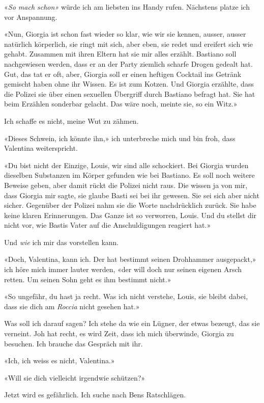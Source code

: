 «\emph{So mach schon»} würde ich am liebsten ins Handy rufen. Nächstens
platze ich vor Anspannung.

«Nun, Giorgia ist schon fast wieder so klar, wie wir sie kennen, ausser,
ausser natürlich körperlich, sie ringt mit sich, aber eben, sie redet
und ereifert sich wie gehabt. Zusammen mit ihren Eltern hat sie mir
alles erzählt. Bastiano soll nachgewiesen werden, dass er an der Party
ziemlich scharfe Drogen gedealt hat. Gut, das tat er oft, aber, Giorgia
soll er einen heftigen Cocktail ins Getränk gemischt haben ohne ihr
Wissen. Es ist zum Kotzen. Und Giorgia erzählte, dass die Polizei sie
über einen sexuellen Übergriff durch Bastiano befragt hat. Sie hat beim
Erzählen sonderbar gelacht. Das wäre noch, meinte sie, so ein Witz.»

Ich schaffe es nicht, meine Wut zu zähmen.

«Dieses Schwein, ich könnte ihn,» ich unterbreche mich und bin froh,
dass Valentina weiterspricht.

«Du bist nicht der Einzige, Louis, wir sind alle schockiert. Bei Giorgia
wurden dieselben Substanzen im Körper gefunden wie bei Bastiano. Es soll
noch weitere Beweise geben, aber damit rückt die Polizei nicht raus. Die
wissen ja von mir, dass Giorgia mir sagte, sie glaube Basti sei bei ihr
gewesen. Sie sei sich aber nicht sicher. Gegenüber der Polizei nahm sie
die Worte nachdrücklich zurück. Sie habe keine klaren Erinnerungen. Das
Ganze ist so verworren, Louis. Und du stellst dir nicht vor, wie Bastis
Vater auf die Anschuldigungen reagiert hat.»

Und \emph{wie} ich mir das vorstellen kann.

«Doch, Valentina, kann ich. Der hat bestimmt seinen Drohhammer
ausgepackt,» ich höre mich immer lauter werden, «der will doch nur
seinen eigenen Arsch retten. Um seinen Sohn geht es ihm bestimmt nicht.»

«So ungefähr, du hast ja recht. Was ich nicht verstehe, Louis, sie
bleibt dabei, dass sie dich am \emph{Roccia} nicht gesehen hat.»

Was soll ich darauf sagen? Ich stehe da wie ein Lügner, der etwas
bezeugt, das sie verneint. Joh hat recht, es wird Zeit, dass ich mich
überwinde, Giorgia zu besuchen. Ich brauche das Gespräch mit ihr.

«Ich, ich weiss es nicht, Valentina.»

«Will sie dich vielleicht irgendwie schützen?»

Jetzt wird es gefährlich. Ich suche nach Bens Ratschlägen.

